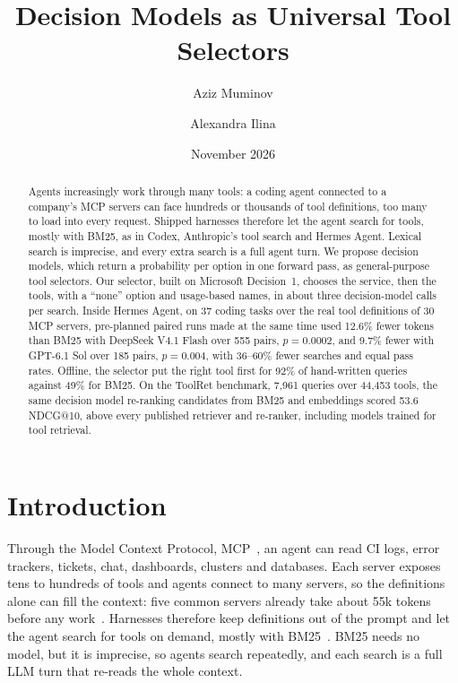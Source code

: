 \documentclass[11pt]{article}
\title{\textbf{Decision Models as Universal Tool Selectors}}
\author{Aziz Muminov \and Alexandra Ilina}
\date{November 2026}
\newcommand{\msd}{Microsoft Decision~1}
\begin{document}
\maketitle

\begin{abstract}
Agents increasingly work through many tools: a coding agent connected to a company's MCP servers can face hundreds or
thousands of tool definitions, too many to load into every request. Shipped harnesses therefore let the agent search
for tools, mostly with BM25, as in Codex, Anthropic's tool search and Hermes Agent. Lexical search is imprecise, and
every extra search is a full agent turn. We propose decision models, which return a probability per option in one
forward pass, as general-purpose tool selectors. Our selector, built on \msd{}, chooses the service, then the tools,
with a ``none'' option and usage-based names, in about three decision-model calls per search. Inside Hermes Agent, on
37 coding tasks over the real tool definitions of 30 MCP servers, pre-planned paired runs made at the same time used
12.6\% fewer tokens than BM25 with DeepSeek V4.1 Flash over 555 pairs, $p=0.0002$, and 9.7\% fewer with GPT-6.1 Sol
over 185 pairs, $p=0.004$, with 36--60\% fewer searches and equal pass rates. Offline, the selector put the right tool
first for 92\% of hand-written queries against 49\% for BM25. On the ToolRet benchmark, 7{,}961 queries over 44{,}453
tools, the same decision model re-ranking candidates from BM25 and embeddings scored 53.6 NDCG@10, above every
published retriever and re-ranker, including models trained for tool retrieval.
\end{abstract}

\section{Introduction}\label{sec:intro}
Through the Model Context Protocol, MCP~\citep{mcp}, an agent can read CI logs, error trackers, tickets, chat,
dashboards, clusters and databases. Each server exposes tens to hundreds of tools and agents connect to many servers,
so the definitions alone can fill the context: five common servers already take about 55k tokens before any
work~\citep{anthropic2025toolsearch}. Harnesses therefore keep definitions out of the prompt and let the agent search
for tools on demand, mostly with BM25~\citep{codexcli,anthropic2025toolsearch,hermesagent}. BM25 needs no model, but
it is imprecise, so agents search repeatedly, and each search is a full LLM turn that re-reads the whole context.
\end{document}
